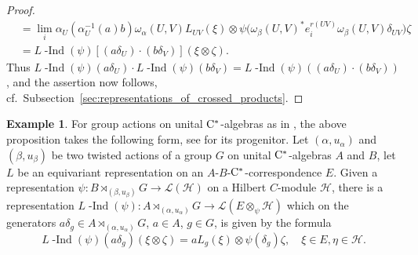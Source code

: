 \documentclass[11 pt, leqno]{amsart}
\numberwithin{equation}{section}
\theoremstyle{plain}
\theoremstyle{definition}
\newtheorem{ex}[thm]{Example}
\newcommand*{\cstar}{\texorpdfstring{\(\Cst\)\nobreakdash-\hspace{0pt}}{*-}}
\newcommand*{\Cst}{\mathrm \cst}%
\DeclareMathOperator{\dashind}{-Ind}
\renewcommand{\H}{\mathcal H}
\newcommand{\LL}{\mathcal L}
\newcommand{\cst}{\ifmmode\mathrm{C}^*\else{$\mathrm{C}^*$}\fi}
\begin{document}
\begin{proof}
\[\begin{split}
        &= \lim_{i} \alpha_U(\alpha_{U}^{-1}(a)b)\omega_{\alpha}(U,V) L_{UV}(\xi) \otimes \psi\Big(\omega_{\beta}(U,V)^* e_{i}^{r(UV)}\omega_{\beta}(U,V)\delta_{UV}\Big) \zeta \\
        &= L\dashind(\psi)[ (a\delta_U)\cdot (b\delta_V)] (\xi\otimes \zeta). 
\end{split}
\]
Thus $L\dashind(\psi)(a\delta_U) \cdot L\dashind(\psi)(b\delta_V) %
=L\dashind(\psi)(   (a\delta_U)\cdot (b\delta_V))$, 
and the assertion now follows, cf.\ Subsection~\ref{sec:representations_of_crossed_products}.
\end{proof}

\begin{ex}
For group actions on unital \cstar{}algebras as in \cite{BedosContiregular,BedosConti,BedosConti2,BedosConti3}, the above proposition takes the following form, see \cite[Lemma 4.9]{BedosContiregular} for its progenitor. 
Let $(\alpha,u_\alpha)$ and $(\beta,u_\beta)$ be two twisted actions  of a group $G$ on unital \cstar{}algebras $A$ and $B$, let $L$ be an equivariant representation on an $A$-$B$-\cstar{}correspondence $E$. 
Given a representation $\psi\colon B\rtimes_{(\beta,u_\beta)}G\to \LL(\H)$ on a Hilbert $C$-module $\H$, there is a representation $L\dashind(\psi)\colon A\rtimes_{(\alpha,u_\alpha)}G\to \LL(E\otimes_\psi \H)$ which on the generators $a\delta_g\in A\rtimes_{(\alpha,u_\alpha)}G$, $a\in A$, $g\in G$, is given by the formula
\[
    L\dashind(\psi)(a\delta_g)(\xi\otimes\zeta)=aL_g(\xi)\otimes\psi(\delta_g)\zeta,\quad \xi\in E,\eta\in \H.
\]
\end{ex}
\end{document}
